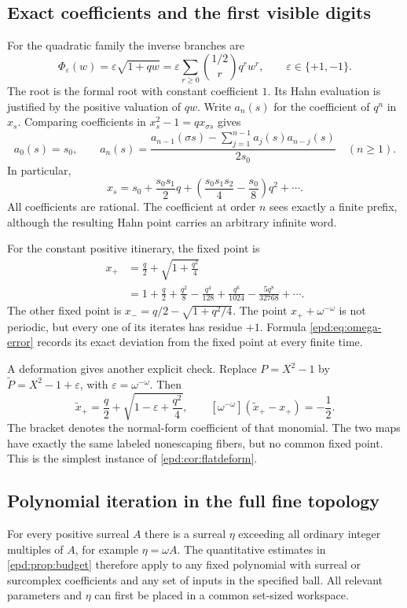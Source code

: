 \documentclass[11pt,a4paper]{article}
\numberwithin{equation}{section}
\theoremstyle{plain}
\theoremstyle{definition}
\theoremstyle{remark}
\newcommand{\sh}{\sigma}
\begin{document}
\subsection{Exact coefficients and the first visible digits}
For the quadratic family the inverse branches are
\[
 \Phi_{\varepsilon}(w)
 =\varepsilon\sqrt{1+qw}
 =\varepsilon\sum_{r\geq0}\binom{1/2}{r}q^rw^r,
 \qquad \varepsilon\in\{+1,-1\}.
\]
The root is the formal root with constant coefficient $1$. Its Hahn
evaluation is justified by the positive valuation of $qw$.
Write $a_n(s)$ for the coefficient of $q^n$ in $x_s$. Comparing
coefficients in $x_s^2-1=qx_{\sh s}$ gives
\begin{equation}\label{epd:eq:binary-recursion}
 a_0(s)=s_0,\qquad
 a_n(s)=\frac{a_{n-1}(\sh s)-
                 \sum_{j=1}^{n-1}a_j(s)a_{n-j}(s)}{2s_0}
 \quad(n\geq1).
\end{equation}
In particular,
\begin{equation}\label{epd:eq:first-coeffs}
 x_s=s_0+\frac{s_0s_1}{2}q+
       \left(\frac{s_0s_1s_2}{4}-\frac{s_0}{8}\right)q^2+\cdots.
\end{equation}
All coefficients are rational. The coefficient at order $n$ sees
exactly a finite prefix, although the resulting Hahn point carries
an arbitrary infinite word.

For the constant positive itinerary, the fixed point is
\begin{align}\label{epd:eq:fixed-plus}
 x_+&=\frac q2+\sqrt{1+\frac{q^2}{4}}\\
 &=1+\frac q2+\frac{q^2}{8}-\frac{q^4}{128}
     +\frac{q^6}{1024}-\frac{5q^8}{32768}+\cdots.\nonumber
\end{align}
The other fixed point is $x_-=q/2-\sqrt{1+q^2/4}$.
The point $x_++\omega^{-\omega}$ is not periodic, but every one of its
iterates has residue $+1$. Formula \eqref{epd:eq:omega-error} records its
exact deviation from the fixed point at every finite time.

A deformation gives another explicit check. Replace $P=X^2-1$ by
$\widetilde P=X^2-1+\varepsilon$, with
$\varepsilon=\omega^{-\omega}$. Then
\[
 \widetilde x_+=\frac q2+
       \sqrt{1-\varepsilon+\frac{q^2}{4}},
 \qquad
 [\omega^{-\omega}](\widetilde x_+-x_+)=-\frac12.
\]
The bracket denotes the normal-form coefficient of that monomial.
The two maps have exactly the same labeled nonescaping fibers, but no
common fixed point. This is the simplest instance of
\cref{epd:cor:flatdeform}.

\subsection{Polynomial iteration in the full fine topology}
For every positive surreal $A$ there is a surreal $\eta$ exceeding all
ordinary integer multiples of $A$, for example $\eta=\omega A$.
The quantitative estimates in \cref{epd:prop:budget} therefore apply to
any fixed polynomial with surreal or surcomplex coefficients and any
set of inputs in the specified ball. All relevant parameters and
$\eta$ can first be placed in a common set-sized workspace.
\end{document}
